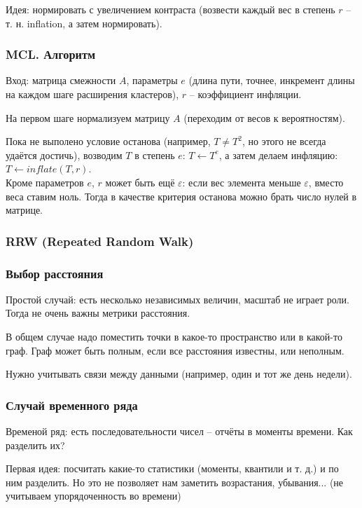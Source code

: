 \documentclass[main.tex]{subfiles}
\begin{document}
Идея: нормировать с увеличением контраста (возвести каждый вес в степень $r$ -- т. н. inflation, а затем нормировать).

\subsubsection{MCL. Алгоритм}

Вход: матрица смежности $A$, параметры $e$ (длина пути, точнее, инкремент длины на каждом шаге расширения кластеров), $r$ -- коэффициент инфляции.

На первом шаге нормализуем матрицу $A$ (переходим от весов к вероятностям).

Пока не выполено условие останова (например, $ T \ne T^2 $, но этого не всегда удаётся достичь),
возводим $T$ в степень $e$: $ T \leftarrow T^e $, а затем делаем инфляцию: $ T \leftarrow inflate(T, r) $. \\

Кроме параметров $e$, $r$ может быть ещё $ \varepsilon $: если вес элемента меньше $\varepsilon$, вместо веса ставим ноль.
Тогда в качестве критерия останова можно брать число нулей в матрице.

\subsubsection{RRW (Repeated Random Walk)}


\subsubsection{Выбор расстояния}

Простой случай: есть несколько независимых величин, масштаб не играет роли.
Тогда не очень важны метрики расстояния.

В общем случае надо поместить точки в какое-то пространство или в какой-то граф.
Граф может быть полным, если все расстояния известны, или неполным.

Нужно учитывать связи между данными (например, один и тот же день недели).

\subsubsection{Случай временного ряда}

Временой ряд: есть последовательности чисел -- отчёты в моменты времени.
Как разделить их?

Первая идея: посчитать какие-то статистики (моменты, квантили и т. д.) и по ним разделить.
Но это не позволяет нам заметить возрастания, убывания... 
(не учитываем упорядоченность во времени)
\end{document}
